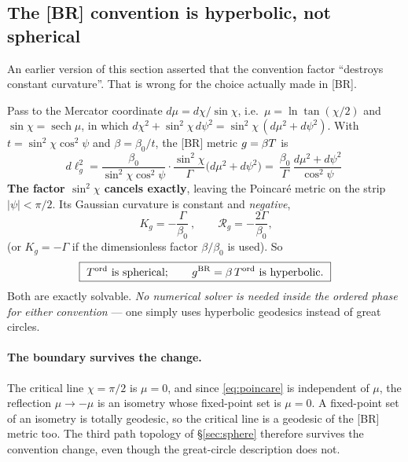 \subsection{The [BR] convention is hyperbolic, not spherical}
\label{sec:hyperbolic}
 An earlier version of this section asserted that the convention factor
``destroys constant curvature''. That is wrong for the choice actually made in [BR].

Pass to the Mercator coordinate $d\mu=d\chi/\sin\chi$, i.e.\ $\mu=\ln\tan(\chi/2)$ and
$\sin\chi=\operatorname{sech}\mu$, in which
$d\chi^{2}+\sin^{2}\!\chi\,d\psi^{2}=\sin^{2}\!\chi\,(d\mu^{2}+d\psi^{2})$. With
$t=\sin^{2}\!\chi\cos^{2}\!\psi$ and $\beta=\beta_0/t$, the [BR] metric $g=\beta T$ is
\begin{equation}
  d\ell_g^{2}
  =\frac{\beta_0}{\sin^{2}\!\chi\cos^{2}\!\psi}\cdot\frac{\sin^{2}\!\chi}{\Gamma}
   \big(d\mu^{2}+d\psi^{2}\big)
  =\boxed{\ \frac{\beta_0}{\Gamma}\,\frac{d\mu^{2}+d\psi^{2}}{\cos^{2}\!\psi}\ }
  \label{eq:poincare}
\end{equation}
\textbf{The factor $\sin^{2}\!\chi$ cancels exactly}, leaving the Poincar\'e metric on the
strip $|\psi|<\pi/2$. Its Gaussian curvature is constant and \emph{negative},
\begin{equation}
  \boxed{\ K_g=-\frac{\Gamma}{\beta_0}\ },\qquad \mathcal R_g=-\frac{2\Gamma}{\beta_0},
\end{equation}
(or $K_g=-\Gamma$ if the dimensionless factor $\beta/\beta_0$ is used). So
\begin{equation}
  \boxed{\ \Tm^{\rm ord}\ \text{is spherical};\qquad
   g^{\rm BR}=\beta\,\Tm^{\rm ord}\ \text{is hyperbolic.}\ }
\end{equation}
Both are exactly solvable. \emph{No numerical solver is needed inside the ordered phase for
either convention} --- one simply uses hyperbolic geodesics instead of great circles.

\paragraph{The boundary survives the change.} The critical line $\chi=\pi/2$ is $\mu=0$, and
since \eqref{eq:poincare} is independent of $\mu$, the reflection $\mu\to-\mu$ is an isometry
whose fixed-point set is $\mu=0$. A fixed-point set of an isometry is totally geodesic, so
the critical line is a geodesic of the [BR] metric too. The third path topology of
\S\ref{sec:sphere} therefore survives the convention change, even though the great-circle
description does not.

